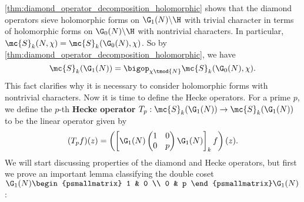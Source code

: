     \cref{thm:diamond_operator_decomposition_holomorphic} shows that the diamond operators sieve holomorphic forms on $\G_{1}(N)\backslash\H$ with trivial character in terms of holomorphic forms on $\G_{0}(N)\backslash\H$ with nontrivial characters. In particular, $\mc{S}_{k}(N,\chi) = \mc{S}_{k}(\G_{0}(N),\chi)$. So by \cref{thm:diamond_operator_decomposition_holomorphic}, we have
    \[
      \mc{S}_{k}(\G_{1}(N)) = \bigop_{\chi \tmod{N}}\mc{S}_{k}(\G_{0}(N),\chi).
    \]
    This fact clarifies why it is necessary to consider holomorphic forms with nontrivial characters. Now it is time to define the Hecke operators. For a prime $p$, we define the $p$-th \textbf{Hecke operator} $T_{p}:\mc{S}_{k}(\G_{1}(N)) \to \mc{S}_{k}(\G_{1}(N))$ to be the linear operator given by
    \[
      (T_{p}f)(z) = \left(\left[\G_{1}(N)\begin{pmatrix} 1 & 0 \\ 0 & p \end{pmatrix}\G_{1}(N)\right]_{k}f\right)(z).
    \]
    We will start discussing properties of the diamond and Hecke operators, but first we prove an important lemma classifying the double coset $\G_{1}(N)\begin{psmallmatrix} 1 & 0 \\ 0 & p \end{psmallmatrix}\G_{1}(N)$:

